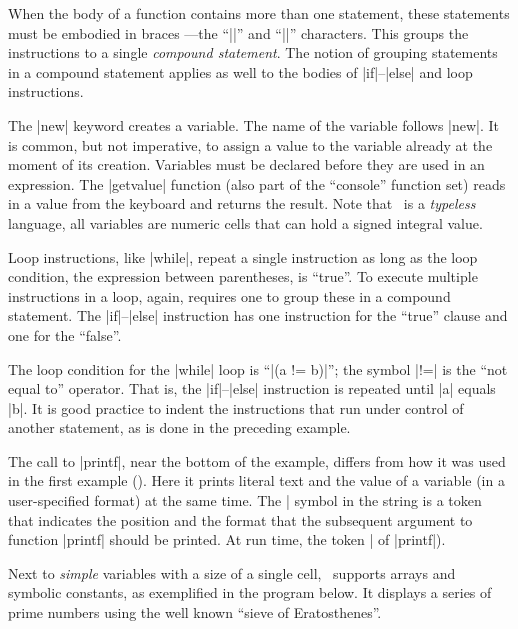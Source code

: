 When the body of a function contains more than one statement, these statements
must be embodied in braces ---the ``|{|'' and ``|}|'' characters.
This groups the instructions to a single {\it compound statement\/}. The
notion of grouping statements in a compound statement applies as well to the
bodies of |if|--|else| and loop instructions.

\noindent{}%
The |new| keyword creates a variable. The name of the variable follows
|new|. It is common, but not imperative, to assign a value to the variable
already at the moment of its creation. Variables must be declared before they
are used in an expression. The |getvalue| function (also part of
the ``console'' function set) reads in a value from the keyboard and returns
the result. Note that \Small\ is a {\it typeless\/} language, all variables
are numeric cells that can hold a signed integral value.

\goodbreak
\noindent{}%
Loop instructions, like |while|, repeat a single instruction as long as the
loop condition, the expression between parentheses, is ``true''. To execute
multiple instructions in a loop, again, requires one to group these
in a compound statement. The |if|--|else| instruction has one instruction for
the ``true'' clause and one for the ``false''.

\noindent{}
The loop condition for the |while| loop is ``|(a != b)|''; the symbol |!=| is
the ``not equal to'' operator. That is, the |if|--|else| instruction is
repeated until |a| equals |b|. It is good practice to indent the
instructions that run under control of another statement, as is done in the
preceding example.

The call to |printf|, near the bottom of the example, differs from how it was
used in the first example (). Here it prints literal text and
the value of a variable (in a user-specified format) at the same time. The |%
symbol in the string is a token that indicates the position and the format that
the subsequent argument to function |printf| should be printed. At run time,
the token |%
of |printf|).

\dingbatseparator

Next to {\it simple\/} variables with a size of a single cell, \Small\ supports
arrays and symbolic constants, as exemplified in the program below. It displays
a series of prime numbers using the well known  ``sieve
of Eratosthenes''.

